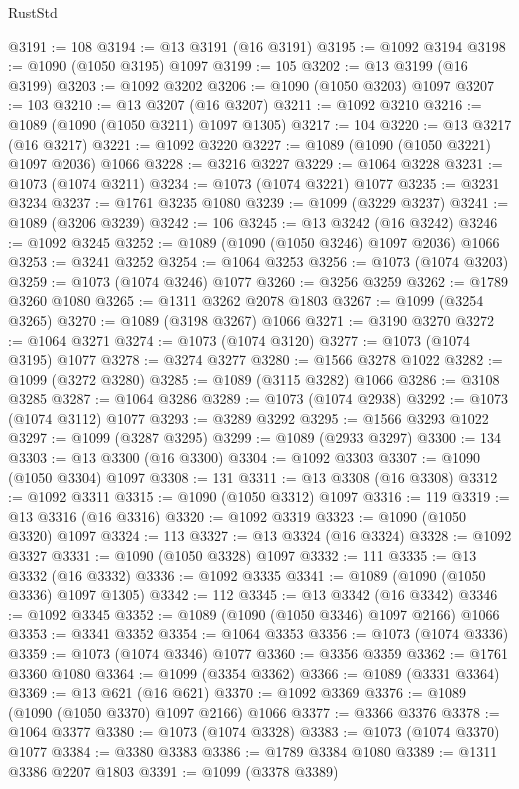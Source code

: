 \begin{lexlean}{RustStd}
\begin{coremodule}
{\begin{coremodule}
{{{{{{{{{{{{{{@3191 := 108
@3194 := @13 @3191 (@16 @3191)
@3195 := @1092 @3194
@3198 := @1090 (@1050 @3195) @1097
@3199 := 105
@3202 := @13 @3199 (@16 @3199)
@3203 := @1092 @3202
@3206 := @1090 (@1050 @3203) @1097
@3207 := 103
@3210 := @13 @3207 (@16 @3207)
@3211 := @1092 @3210
@3216 := @1089 (@1090 (@1050 @3211) @1097 @1305)
@3217 := 104
@3220 := @13 @3217 (@16 @3217)
@3221 := @1092 @3220
@3227 := @1089 (@1090 (@1050 @3221) @1097 @2036) @1066
@3228 := @3216 @3227
@3229 := @1064 @3228
@3231 := @1073 (@1074 @3211)
@3234 := @1073 (@1074 @3221) @1077
@3235 := @3231 @3234
@3237 := @1761 @3235 @1080
@3239 := @1099 (@3229 @3237)
@3241 := @1089 (@3206 @3239)
@3242 := 106
@3245 := @13 @3242 (@16 @3242)
@3246 := @1092 @3245
@3252 := @1089 (@1090 (@1050 @3246) @1097 @2036) @1066
@3253 := @3241 @3252
@3254 := @1064 @3253
@3256 := @1073 (@1074 @3203)
@3259 := @1073 (@1074 @3246) @1077
@3260 := @3256 @3259
@3262 := @1789 @3260 @1080
@3265 := @1311 @3262 @2078 @1803
@3267 := @1099 (@3254 @3265)
@3270 := @1089 (@3198 @3267) @1066
@3271 := @3190 @3270
@3272 := @1064 @3271
@3274 := @1073 (@1074 @3120)
@3277 := @1073 (@1074 @3195) @1077
@3278 := @3274 @3277
@3280 := @1566 @3278 @1022
@3282 := @1099 (@3272 @3280)
@3285 := @1089 (@3115 @3282) @1066
@3286 := @3108 @3285
@3287 := @1064 @3286
@3289 := @1073 (@1074 @2938)
@3292 := @1073 (@1074 @3112) @1077
@3293 := @3289 @3292
@3295 := @1566 @3293 @1022
@3297 := @1099 (@3287 @3295)
@3299 := @1089 (@2933 @3297)
@3300 := 134
@3303 := @13 @3300 (@16 @3300)
@3304 := @1092 @3303
@3307 := @1090 (@1050 @3304) @1097
@3308 := 131
@3311 := @13 @3308 (@16 @3308)
@3312 := @1092 @3311
@3315 := @1090 (@1050 @3312) @1097
@3316 := 119
@3319 := @13 @3316 (@16 @3316)
@3320 := @1092 @3319
@3323 := @1090 (@1050 @3320) @1097
@3324 := 113
@3327 := @13 @3324 (@16 @3324)
@3328 := @1092 @3327
@3331 := @1090 (@1050 @3328) @1097
@3332 := 111
@3335 := @13 @3332 (@16 @3332)
@3336 := @1092 @3335
@3341 := @1089 (@1090 (@1050 @3336) @1097 @1305)
@3342 := 112
@3345 := @13 @3342 (@16 @3342)
@3346 := @1092 @3345
@3352 := @1089 (@1090 (@1050 @3346) @1097 @2166) @1066
@3353 := @3341 @3352
@3354 := @1064 @3353
@3356 := @1073 (@1074 @3336)
@3359 := @1073 (@1074 @3346) @1077
@3360 := @3356 @3359
@3362 := @1761 @3360 @1080
@3364 := @1099 (@3354 @3362)
@3366 := @1089 (@3331 @3364)
@3369 := @13 @621 (@16 @621)
@3370 := @1092 @3369
@3376 := @1089 (@1090 (@1050 @3370) @1097 @2166) @1066
@3377 := @3366 @3376
@3378 := @1064 @3377
@3380 := @1073 (@1074 @3328)
@3383 := @1073 (@1074 @3370) @1077
@3384 := @3380 @3383
@3386 := @1789 @3384 @1080
@3389 := @1311 @3386 @2207 @1803
@3391 := @1099 (@3378 @3389)
}}}}}}}}}}}}}}
\end{coremodule}}
\end{coremodule}
\end{lexlean}

